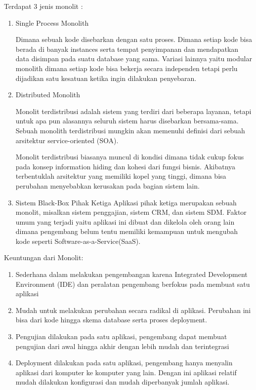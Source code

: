 Terdapat 3 jenis monolit \cite{6}:
\begin{enumerate}[leftmargin=1.3cm]
\item Single Process Monolith

Dimana sebuah kode disebarkan dengan satu proses. Dimana setiap kode bisa berada di banyak instances serta tempat penyimpanan dan mendapatkan data disimpan pada suatu database yang sama. Variasi lainnya yaitu modular monolith dimana setiap kode bisa bekerja secara independen tetapi perlu dijadikan satu kesatuan ketika ingin dilakukan penyebaran.
\item Distributed Monolith

Monolit terdistribusi adalah sistem yang terdiri dari beberapa layanan, tetapi untuk apa pun alasannya seluruh sistem harus disebarkan bersama-sama. Sebuah monolith terdistribusi mungkin akan memenuhi definisi dari sebuah arsitektur service-oriented (SOA).

Monolit terdistribusi biasanya muncul  di kondisi dimana tidak cukup fokus pada konsep information hiding dan kohesi dari fungsi bisnis. Akibatnya terbentuklah arsitektur yang memiliki kopel yang tinggi, dimana bisa perubahan menyebabkan kerusakan pada bagian sistem lain.
\item Sistem Black-Box Pihak Ketiga
Aplikasi pihak ketiga merupakan sebuah monolit, misalkan sistem penggajian, sistem CRM, dan sistem SDM. Faktor umum yang terjadi yaitu aplikasi ini dibuat dan dikelola oleh orang lain dimana pengembang belum tentu memiliki kemampuan untuk mengubah kode seperti Software-as-a-Service(SaaS).
\end{enumerate}

Keuntungan dari Monolit:
\begin{enumerate}[leftmargin=1.3cm]
	\item Sederhana dalam melakukan pengembangan karena Integrated Development Environment (IDE) dan peralatan pengembang berfokus pada membuat satu aplikasi
\item Mudah untuk melakukan perubahan secara radikal di aplikasi. Perubahan ini bisa dari kode hingga skema database serta proses deployment.
\item Pengujian dilakukan pada satu aplikasi, pengembang dapat membuat pengujian dari awal hingga akhir dengan lebih mudah dan terintegrasi
\item Deployment dilakukan pada satu aplikasi, pengembang hanya menyalin aplikasi dari komputer ke komputer yang lain. Dengan ini aplikasi relatif mudah dilakukan konfigurasi dan mudah diperbanyak jumlah aplikasi.
\end{enumerate}

